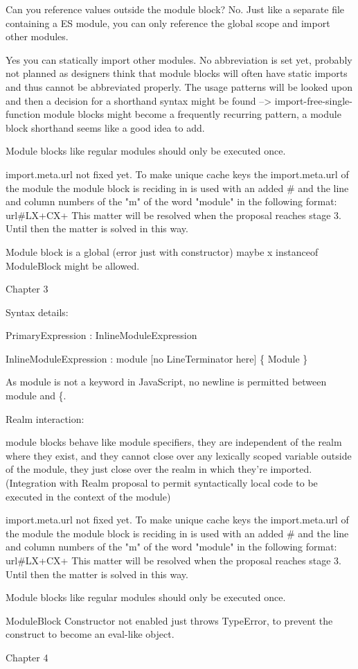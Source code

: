     Can you reference values outside the module block? No. Just like a separate file containing a ES module, you can only reference the global scope and import other modules.
    
    Yes you can statically import other modules.
    No abbreviation is set yet, probably not planned as designers think that module blocks will often have static imports and thus cannot be abbreviated properly. The usage patterns will be looked upon and then a decision for a shorthand syntax might be found --> import-free-single-function module blocks might become a frequently recurring pattern, a module block shorthand seems like a good idea to add.
    
Module blocks like regular modules should only be executed once.

import.meta.url not fixed yet. To make unique cache keys the import.meta.url of the module the module block is reciding in is used with an added # and the line and column numbers of the "m" of the word "module" in the following format:
    url#LX+CX+
This matter will be resolved when the proposal reaches stage 3. Until then the matter is solved in this way.

Module block is a global (error just with constructor) maybe x instanceof ModuleBlock might be allowed.

Chapter 3

Syntax details:

PrimaryExpression : InlineModuleExpression

InlineModuleExpression : module [no LineTerminator here] \{ Module \}

As module is not a keyword in JavaScript, no newline is permitted between module and \{.

Realm interaction:

module blocks behave like module specifiers, they are independent of the realm where they exist, and they cannot close over any lexically scoped variable outside of the module, they just close over the realm in which they're imported. (Integration with Realm proposal to permit syntactically local code to be executed in the context of the module)

import.meta.url not fixed yet. To make unique cache keys the import.meta.url of the module the module block is reciding in is used with an added # and the line and column numbers of the "m" of the word "module" in the following format:
url#LX+CX+
This matter will be resolved when the proposal reaches stage 3. Until then the matter is solved in this way.

Module blocks like regular modules should only be executed once.

ModuleBlock Constructor not enabled just throws TypeError, to prevent the construct to become an eval-like object.

Chapter 4